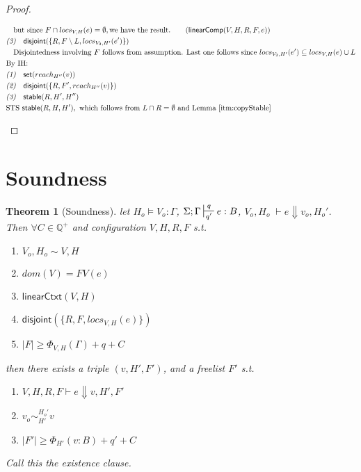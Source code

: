 \documentclass{easychair}
\newtheorem{theorem}{Theorem}
\newcommand{\na}[1]{\mathsf{linearCtxt}(#1)}
\newcommand{\stable}[1]{\mathsf{stable}(#1)}
\newcommand{\set}[1]{\mathsf{set}(#1)}
\newcommand{\dist}[1]{\mathsf{disjoint}(#1)}
\newcommand{\wfc}[5]{\mathsf{linearComp}(#1,#2,#3,#4,#5)}
\newcommand{\veq}[4]{#3 \sim^{#1}_{#2} #4}
\theoremstyle{definition}
\begin{document}
\begin{proof}
\begin{description}
\begin{align*}
	&\quad \text{but since } F \cap locs_{V,H}(e) = \emptyset, \text{we have the result.}
		 \tag{$\wfc{V}{H}{R}{F}{e}$}\\
  &\emph{(3)} \quad \dist{\{R,F \setminus L,locs_{V_2,H'}(e')\}}\\
	&\quad \text{Disjointedness involving $F$ follows from assumption. Last one follows since }
		locs_{V_2,H'}(e') \subseteq locs_{V,H}(e) \cup L\\
	&\text{By IH:}\\
  &\emph{(1)} \quad \set{reach_{H''}(v)}\\
  &\emph{(2)} \quad \dist{\{R,F',reach_{H''}(v)\}}\\
  &\emph{(3)} \quad \stable{R,H',H''}\\
		&\text{STS } \stable{R,H,H'}, \text{ which follows from $L \cap R = \emptyset$ and Lemma~\ref{itm:copyStable}}\\
  \end{align*}
  \end{description}
\end{proof}

\section{Soundness}
\begin{theorem}[Soundness]
\label{b} let $H_o \vDash V_o : \Gamma$, $\Sigma; \Gamma \sststile{q'}{q} e : B$,
$V_o,H_o \; \vdash e \Downarrow v_o, H_o'$.
Then $\forall C \in \mathbb{Q}^{+}$ and configuration $V,H,R,F$ s.t.
\begin{enumerate} 
\item $V_o,H_o \sim V,H$
\item $dom(V) = FV(e)$
\item $\na{V,H}$
\item $\dist{\{R,F,locs_{V,H}(e)\}}$
\item $|F| \ge \Phi_{V,H}(\Gamma) + q + C$ 
\end{enumerate}
then there exists a triple $(v,H',F')$, and a freelist $F'$ s.t.
\begin{enumerate}
  \item $V,H,R,F \vdash e \Downarrow v, H', F'$
	\item $\veq{H_o'}{H'}{v_o}{v}$
  \item $|F'| \ge \Phi_{H'}(v:B) + q' + C$
\end{enumerate}
Call this the existence clause.
\end{theorem}
\end{document}
